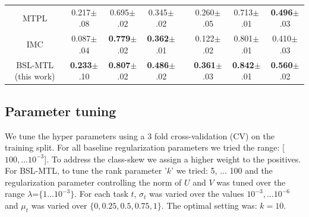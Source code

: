 \documentclass{bioinfo}
\begin{document}
\begin{table}[t]
\begin{small}
\begin{center}
\begin{tabular}{c|ccccccc}
MTPL \citep{me_ismb_2013} & 0.217$\pm$.08 & 0.695$\pm$.02 & 0.345$\pm$.02 && 0.260$\pm$.05 & 0.713$\pm$.01 & \textbf{0.496}$\pm$.03 \\ 
IMC \citep{nagarajan} & 0.087$\pm$.04 & \textbf{0.779}$\pm$.02 & \textbf{0.362}$\pm$.01 && 0.122$\pm$.02 & 0.801$\pm$.01 & 0.410$\pm$.03  \\ \midrule
BSL-MTL (this work) & \textbf{0.233}$\pm$.10 & \textbf{0.807}$\pm$.02 & \textbf{0.486}$\pm$.02 && \textbf{0.361}$\pm$.03 & \textbf{0.842}$\pm$.01 & \textbf{0.560}$\pm$.02  \\ \bottomrule
\end{tabular}
\end{center}
\end{small}
\end{table}


\subsection{Parameter tuning}
We tune the hyper parameters using a 3 fold cross-validation (CV) on the training split. For all baseline regularization parameters %
we tried the range: [$100, ...10^{-3}$]. To address the class-skew we 
assign a higher weight to the positives. For BSL-MTL, to tune the rank parameter '$k$' we tried: 5, ... 100 and the regularization parameter controlling the norm of $U$ and $V$ was tuned over the range $\lambda$=$\{1 ... 10^{-3}\}$. For each task $t$, $\sigma_t$ was varied over the values $10^{-3}, ... 10^{-6}$ and
$\mu_t$ was varied over $\{0, 0.25, 0.5, 0.75, 1\}$.
The optimal setting was:  $k=10$. %

\end{document}
